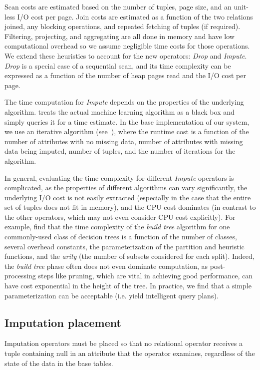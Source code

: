 Scan costs are estimated based on the number of tuples, 
page size, and an unit-less I/O cost per page. Join costs are estimated as a function
of the two relations joined, any blocking operations, and repeated fetching of tuples (if required).
Filtering, projecting, and aggregating are all done in memory and have low computational overhead
so we assume negligible time costs for those operations. We extend these heuristics to 
account for the new operators: \textit{Drop} and \textit{Impute}. \textit{Drop} is a special case of a sequential scan, and its time
complexity can be expressed as a function of the number of heap pages read and the I/O cost
per page.

The time computation for \textit{Impute} depends on the properties of the underlying
algorithm. \ProjectName{} treats the actual machine learning algorithm as a black box
and simply queries it for a time estimate. In the base implementation of our system,
we use an iterative algorithm (see~), where the runtime cost
is a function of the number of attributes with no missing data, number of attributes with
missing data being imputed, number of tuples, and the number of iterations for the algorithm.

In general, evaluating the time complexity for different \textit{Impute} operators is
complicated, as the properties of
different algorithms can vary significantly, the underlying I/O cost
is not easily extracted (especially in the case that the entire set of tuples does not
fit in memory), and the CPU cost dominates (in contrast to the other operators, which may
not even consider CPU cost explicitly). For example, \cite{martin1995time} find that the
time complexity of the \textit{build tree} algorithm for one commonly-used class of
decision trees is a function of the number of classes, several overhead constants, the
parameterization of the partition and heuristic functions, and the \textit{arity} (the
number of subsets considered for each split). Indeed, the \textit{build tree} phase often
does not even dominate computation, as post-processing steps like pruning, which are vital
in achieving good performance, can have cost exponential in the height of the tree. In
practice, we find that a simple parameterization can be acceptable (i.e. yield intelligent query
plans).


\subsection{Imputation placement}
\label{sec:placement}
Imputation operators must be placed so that no relational operator receives a tuple containing null in an attribute that the operator examines, regardless of the state of the data in the base tables.

